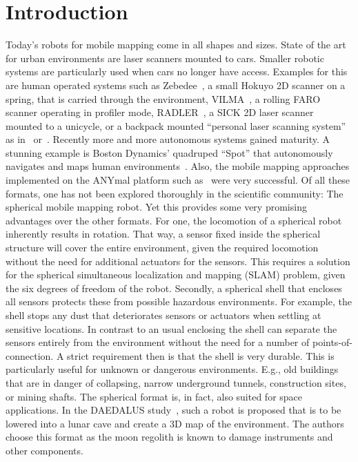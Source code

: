 \section{Introduction}

Today's robots for mobile mapping come in all shapes and sizes.
State of the art for urban environments are laser scanners mounted to cars.
Smaller robotic systems are particularly used when cars no longer have access.
Examples for this are human operated systems such as Zebedee~\cite{Bosse2012-zebedee}, a small Hokuyo 2D scanner on a spring, that is carried through the environment, VILMA~\cite{JPRS2016}, a rolling FARO scanner operating in profiler mode, RADLER~\cite{Borrmann2020-RADLER}, a SICK 2D laser scanner mounted to a unicycle, or a backpack mounted ``personal laser scanning system'' as in~\cite{LauterbackEtAl2015-Backpack} or~\cite{WWWLeicaBackpack}.
Recently more and more autonomous systems gained maturity.
A stunning example is Boston Dynamics' quadruped ``Spot'' that autonomously navigates and maps human environments~\cite{SpotRobot}.
Also, the mobile mapping approaches implemented on the ANYmal platform such as~\cite{Fankhauser2018-ANYmal} were very successful.
Of all these formats, one has not been explored thoroughly in the scientific community: The spherical mobile mapping robot.
Yet this provides some very promising advantages over the other formats.
For one, the locomotion of a spherical robot inherently results in rotation.
That way, a sensor fixed inside the spherical structure will cover the entire environment, given the required locomotion without the need for additional actuators for the sensors.
This requires a solution for the spherical simultaneous localization and mapping (SLAM) problem, given the six degrees of freedom of the robot.
Secondly, a spherical shell that encloses all sensors protects these from possible hazardous environments.  
For example, the shell stops any dust that deteriorates sensors or actuators when settling at sensitive locations.
In contrast to an usual enclosing the shell can separate the sensors entirely from the environment without the need for a number of points-of-connection. 
A strict requirement then is that the shell is very durable.
This is particularly useful for unknown or dangerous environments.
E.g., old buildings that are in danger of collapsing, narrow underground tunnels, construction sites, or mining shafts. 
The spherical format is, in fact, also suited for space applications.
In the DAEDALUS study~\cite{RossiMaurelliUnnithanetal.2021}, such a robot is proposed that is to be lowered into a lunar cave and create a 3D map of the environment. The authors choose this format as the moon regolith is known to damage instruments and other components.
